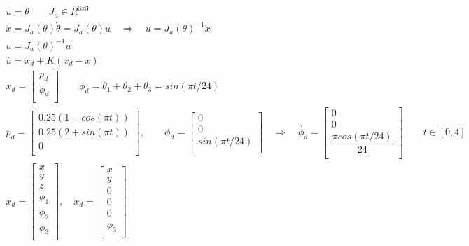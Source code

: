 \documentclass[a4paper,11pt]{article}
\theoremstyle{mytheor}
\begin{document}
\begin{gather*}
	u = \dot{\theta} \qquad J_a \in R^{3x3} \\
	\dot{x} = J_a(\theta)\dot{\theta} = J_a(\theta)u \quad \Rightarrow \quad
	u = J_a(\theta)^{-1}\dot{x} \\
	u = J_a(\theta)^{-1} \bar{u} \\
	\bar{u} = \dot{x_d} + K (x_d - x) \\
	x_d = 
	\begin{bmatrix} 
	p_d \\ 
	\phi_d \\
	\end{bmatrix} \qquad 
	\phi_d = \theta_1 + \theta_2 + \theta_3 = sin(\pi t / 24) \\
	p_{d} = 
	\begin{bmatrix} 
	0.25 (1 - cos(\pi t)) \\ 
	0.25 (2 + sin(\pi t)) \\
	0 \\
	\end{bmatrix}, \qquad 
	\phi_{d} = 
	\begin{bmatrix} 
	0 \\ 
	0 \\
	sin(\pi t / 24) \\
	\end{bmatrix} \quad \Rightarrow \quad 
	\dot{\phi_d} = 
	\begin{bmatrix} 
	0 \\
	0 \\
	\dfrac{\pi cos(\pi t / 24)}{24} \\
	\end{bmatrix} \qquad t \in [0,4] \\
	x_d = 
	\begin{bmatrix} 
	x \\ 
	y \\
	z \\
	\phi_1 \\
	\phi_2 \\
	\phi_3 \\
	\end{bmatrix}, \quad
	x_d = 
	\begin{bmatrix} 
	x \\ 
	y \\
	0 \\
	0 \\
	0 \\
	\phi_3 \\
	\end{bmatrix}
\end{gather*}
 
\end{document}
